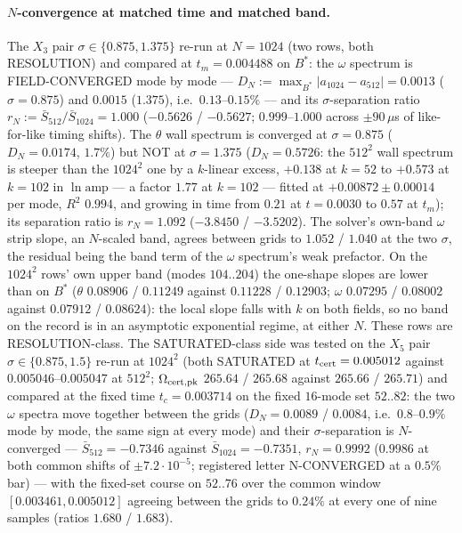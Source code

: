 \documentclass[11pt,a4paper]{article}
\newcommand{\abs}[1]{\lvert #1 \rvert}
\newcommand{\Om}{\Omega_{\rm cert,pk}}
\newcommand{\tcert}{t_{\rm cert}}
\newcommand{\tm}{t_m}
\newcommand{\Bst}{B^*}
\newcommand{\Sbar}{\bar S}
\begin{document}
\paragraph{$N$-convergence at matched time and matched band.} The $X_3$ pair $\sigma\in\{0.875,1.375\}$ re-run at $N=1024$ (two rows, both RESOLUTION) and compared at $\tm=0.004488$ on $\Bst$: the $\omega$ spectrum is FIELD-CONVERGED mode by mode --- $D_N:=\max_{\Bst}\abs{a_{1024}-a_{512}}=0.0013$ ($\sigma=0.875$) and $0.0015$ ($1.375$), i.e.\ $0.13$--$0.15\%$ --- and its $\sigma$-separation ratio $r_N:=\Sbar_{512}/\Sbar_{1024}=1.000$ ($-0.5626$ / $-0.5627$; $0.999$--$1.000$ across $\pm90\,\mu$s of like-for-like timing shifts). The $\theta$ wall spectrum is converged at $\sigma=0.875$ ($D_N=0.0174$, $1.7\%$) but NOT at $\sigma=1.375$ ($D_N=0.5726$: the $512^2$ wall spectrum is steeper than the $1024^2$ one by a $k$-linear excess, $+0.138$ at $k=52$ to $+0.573$ at $k=102$ in $\ln\mathrm{amp}$ --- a factor $1.77$ at $k=102$ --- fitted at $+0.00872\pm0.00014$ per mode, $R^2$ $0.994$, and growing in time from $0.21$ at $t=0.0030$ to $0.57$ at $\tm$); its separation ratio is $r_N=1.092$ ($-3.8450$ / $-3.5202$). The solver's own-band $\omega$ strip slope, an $N$-scaled band, agrees between grids to $1.052$ / $1.040$ at the two $\sigma$, the residual being the band term of the $\omega$ spectrum's weak prefactor. On the $1024^2$ rows' own upper band (modes $104..204$) the one-shape slopes are lower than on $\Bst$ ($\theta$ $0.08906$ / $0.11249$ against $0.11228$ / $0.12903$; $\omega$ $0.07295$ / $0.08002$ against $0.07912$ / $0.08624$): the local slope falls with $k$ on both fields, so no band on the record is in an asymptotic exponential regime, at either $N$. These rows are RESOLUTION-class. The SATURATED-class side was tested on the $X_5$ pair $\sigma\in\{0.875,1.5\}$ re-run at $1024^2$ (both SATURATED at $\tcert=0.005012$ against $0.005046$--$0.005047$ at $512^2$; $\Om$ $265.64$ / $265.68$ against $265.66$ / $265.71$) and compared at the fixed time $t_c=0.003714$ on the fixed $16$-mode set $52..82$: the two $\omega$ spectra move together between the grids ($D_N=0.0089$ / $0.0084$, i.e.\ $0.8$--$0.9\%$ mode by mode, the same sign at every mode) and their $\sigma$-separation is $N$-converged --- $\Sbar_{512}=-0.7346$ against $\Sbar_{1024}=-0.7351$, $r_N=0.9992$ ($0.9986$ at both common shifts of $\pm7.2\cdot10^{-5}$; registered letter N-CONVERGED at a $0.5\%$ bar) --- with the fixed-set course on $52..76$ over the common window $[0.003461,0.005012]$ agreeing between the grids to $0.24\%$ at every one of nine samples (ratios $1.680$ / $1.683$).
\end{document}
